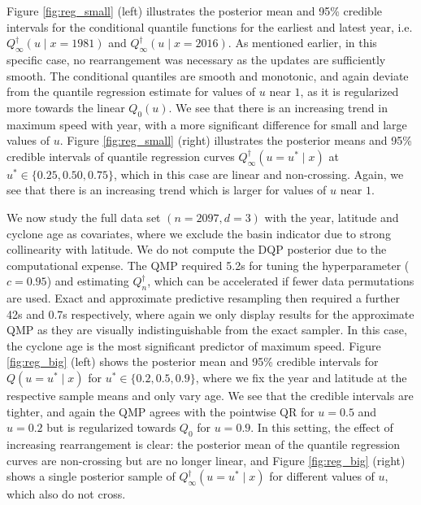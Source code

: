 \documentclass[11pt,a4paper]{article}
\begin{document}
{Figure \ref{fig:reg_small} (left)} illustrates the posterior mean and 95\% credible intervals for the conditional quantile functions for the earliest and latest year, i.e. $Q_\infty^{\dagger}(u \mid x = 1981)$ and $Q_\infty^{\dagger}(u \mid x = 2016)$. As mentioned earlier, in this specific case, no rearrangement was necessary as the updates are sufficiently smooth. The conditional quantiles are smooth and monotonic, and again deviate from the quantile regression estimate for values of $u$ near $1$, as it is regularized more towards the linear $Q_0(u)$. We see that there is an increasing trend in maximum speed with year, with a more significant difference for small and large values of $u$. {Figure \ref{fig:reg_small} (right)} illustrates the posterior means and 95\% credible intervals of quantile regression curves $Q_\infty^{\dagger}(u  = u^*\mid x)$ at $u^* \in \{0.25,0.50,0.75\}$, which in this case are linear and non-crossing. Again, we see that there is an increasing trend which is larger for values of $u$ near $1$.

We now study the full data set $(n = 2097, d = 3)$ with the year, latitude and cyclone age as covariates, where we exclude the basin indicator due to strong collinearity with latitude.  We do not compute the DQP posterior due to the computational expense. The QMP required 5.2s for tuning the hyperparameter ($c = 0.95$) and estimating $Q_n^{\dagger}$, which can be accelerated if fewer data permutations are used. Exact and approximate predictive resampling then required a further 42s and 0.7s respectively, where again we only display results for the approximate QMP as they are visually indistinguishable from the exact sampler. In this case, the cyclone age is the most significant predictor of maximum speed. 
{Figure \ref{fig:reg_big} (left)} shows the posterior mean and 95\% credible intervals for $Q(u = u^* \mid x)$ for $u^* \in \{0.2,0.5,0.9\}$, where we fix the year and latitude at the respective sample means and only vary age. We see that the credible intervals are tighter, and again the QMP agrees with the pointwise QR for $u = 0.5$ and $u = 0.2$  but is regularized towards $Q_0$ for $u = 0.9$. In this setting, the effect of increasing rearrangement is clear: the posterior mean of the quantile regression curves are non-crossing but are no longer linear, and {Figure \ref{fig:reg_big} (right)} shows a single posterior sample of $Q_\infty^{\dagger}(u= u^* \mid x)$ for different values of $u$, which also do not cross.   
\end{document}
